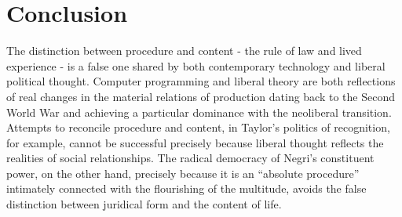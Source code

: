 \documentclass[12pt,oneside]{memoir}
\begin{document}
	
\section{Conclusion}

The distinction between procedure and content - the rule of law and lived experience - is a false one shared by both contemporary technology and liberal political thought. Computer programming and liberal theory are both reflections of real changes in the material relations of production dating back to the Second World War and achieving a particular dominance with the neoliberal transition. Attempts to reconcile procedure and content, in Taylor's politics of recognition, for example, cannot be successful precisely because liberal thought reflects the realities of social relationships. The radical democracy of Negri's constituent power, on the other hand, precisely because it is an ``absolute procedure'' intimately connected with the flourishing of the multitude, avoids the false distinction between juridical form and the content of life.

\backmatter

 

\end{document}
